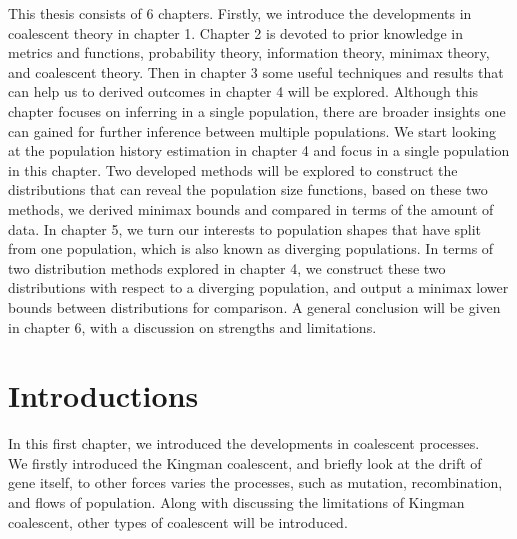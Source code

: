 \documentclass[12pt, a4paper,twoside]{report}
\theoremstyle{definition}
\theoremstyle{myplain}
\theoremstyle{mypro}
\begin{document}
This thesis consists of 6 chapters. Firstly, we introduce the developments in coalescent theory in chapter 1. Chapter 2 is devoted to prior knowledge in metrics and functions, probability theory, information theory, minimax theory, and coalescent theory. Then in chapter 3 some useful techniques and results that can help us to derived outcomes in chapter 4 will be explored. Although this chapter focuses on inferring in a single population, there are broader insights one can gained for further inference between multiple populations. We start looking at the population history estimation in chapter 4 and focus in a single population in this chapter. Two developed methods will be explored to construct the distributions that can reveal the population size functions, based on these two methods, we derived minimax bounds and compared in terms of the amount of data. In chapter 5, we turn our interests to population shapes that have split from one population, which is also known as diverging populations. In terms of two distribution methods explored in chapter 4, we construct these two distributions with respect to a diverging population, and output a minimax lower bounds between distributions for comparison. A general conclusion will be given in chapter 6, with a discussion on strengths and limitations.

\clearpage

\chapter{Introductions}
In this first chapter, we introduced the developments in coalescent processes.\\

We firstly introduced the Kingman coalescent, and briefly look at the drift of gene itself, to other forces varies the processes, such as mutation, recombination, and flows of population. Along with discussing the limitations of Kingman coalescent, other types of coalescent will be introduced.\\
\end{document}
